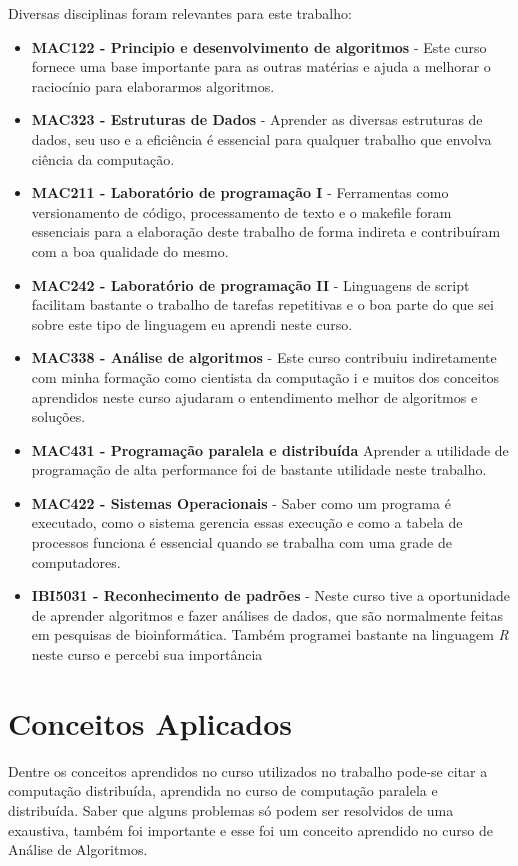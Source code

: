 Diversas disciplinas foram relevantes para este trabalho:

\begin{itemize}
  \item \textbf{MAC122 - Principio e desenvolvimento de algoritmos } - Este curso fornece uma base importante para as outras matérias e
ajuda a melhorar o raciocínio para elaborarmos algoritmos.
  \item \textbf{MAC323 - Estruturas de Dados } - Aprender as diversas estruturas de dados, seu uso e a eficiência é essencial
para qualquer trabalho que envolva ciência da computação.
  \item \textbf{MAC211 - Laboratório de programação I} - Ferramentas como ver\-si\-o\-na\-men\-to de código, processamento de 
texto e o makefile foram essenciais para a elaboração deste trabalho de forma indireta e contribuíram com a 
boa qualidade do mesmo.
  \item \textbf{MAC242 - Laboratório de programação II} - Linguagens de script facilitam bastante o trabalho de tarefas 
repetitivas e o boa parte do que sei sobre este tipo de linguagem eu aprendi neste curso.
  \item \textbf{MAC338 - Análise de algoritmos} - Este curso contribuiu indiretamente com minha formação como cientista da computação i
e muitos dos conceitos aprendidos neste curso ajudaram o entendimento melhor de algoritmos e soluções.
  \item \textbf{MAC431 - Programação paralela e distribuída} Aprender a utilidade de programação de alta performance foi de bastante utilidade
neste trabalho.
  \item \textbf{MAC422 - Sistemas Operacionais} - Saber como um programa é executado, como o sistema gerencia essas execução e como a tabela de processos
funciona é essencial quando se trabalha com uma grade de computadores. 
  \item \textbf{IBI5031 - Reconhecimento de padrões} - Neste curso tive a oportunidade de aprender algoritmos e fazer análises de dados, 
que são normalmente feitas em pesquisas de bioinformática. Também programei bastante na linguagem \emph{R} neste curso e percebi sua
importância
\end{itemize}

\section{Conceitos Aplicados}

Dentre os conceitos aprendidos no curso utilizados no trabalho pode-se citar a computação distribuída, aprendida no curso de
computação paralela e distribuída. Saber que alguns problemas só podem ser resolvidos de uma exaustiva, também 
foi importante e esse foi um conceito aprendido no curso de Análise de Algoritmos.  


